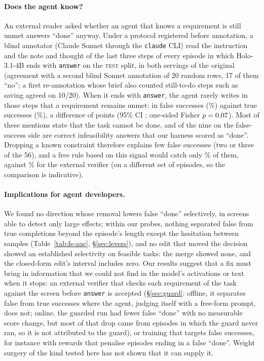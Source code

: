 \paragraph{Does the agent know?} An external reader asked whether an agent that knows a requirement is still unmet answers ``done'' anyway. Under a protocol registered before annotation, a blind annotator (Claude Sonnet through the \texttt{claude} CLI) read the instruction and the note and thought of the last three steps of every episode in which Holo-3.1-4B ends with \texttt{answer} on the \textsc{test} split, in both servings of the original (agreement \cdAudit{} with a second blind Sonnet annotation of 20 random rows, 17 of them ``no''; a first re-annotation whose brief also counted still-to-do steps such as saving agreed on 10/20). When it ends with \texttt{answer}, the agent rarely writes in those steps that a requirement remains unmet: in \cdFs{} false successes (\cdFsPct\%) against \cdTs{} true successes (\cdTsPct\%), a difference of \cdDiff{} points (95\% CI \cdDiffCi; one-sided Fisher $p=0.07$). Most of these mentions state that the task cannot be done, and \cdRegex{} of the nine on the false-success side are correct infeasibility answers that our harness scored as ``done''. Dropping a known constraint therefore explains few false successes (two or three of the 56), and a free rule based on this signal would catch only \cdFsPct\% of them, against \gbClaudeDet\% for the external verifier (on a different set of episodes, so the comparison is indicative). %

\paragraph{Implications for agent developers.} We found no direction whose removal lowers false ``done'' selectively, in screens able to detect only large effects; within our probes, nothing separated false from true completions beyond the episode's length except the hesitation between samples (Table~\ref{tab:fs-auc}, \S\ref{sec:levers}), and no edit that moved the decision showed an established selectivity on feasible tasks: the merge showed none, and the closed-form edit's interval includes zero. Our results suggest that a fix must bring in information that we could not find in the model's activations or text when it stops: an external verifier that checks each requirement of the task against the screen before \texttt{answer} is accepted (\S\ref{sec:guard}: offline, it separates false from true successes where the agent, judging itself with a free-form prompt, does not; online, the guarded run had fewer false ``done'' with no measurable score change, but most of that drop came from episodes in which the guard never ran, so it is not attributed to the guard), or training that targets false successes, for instance with rewards that penalise episodes ending in a false ``done''. Weight surgery of the kind tested here has not shown that it can supply it.

